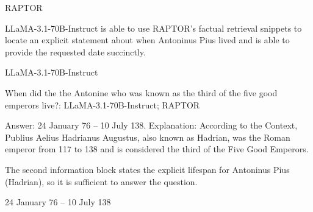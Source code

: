 \begin{tcolorbox}
RAPTOR \par

LLaMA-3.1-70B-Instruct is able to use RAPTOR’s factual retrieval snippets to locate an explicit statement about when Antoninus Pius lived and is able to provide the requested date succinctly. \par

LLaMA-3.1-70B-Instruct \par

{\raggedright
{}When did the the Antonine who was known as the third of the five good emperors live?: LLaMA-3.1-70B-Instruct; RAPTOR\par
}

Answer: 24 January 76 -- 10 July 138. Explanation: According to the Context, Publius Aelius Hadrianus Augustus, also known as Hadrian, was the Roman emperor from 117 to 138 and is considered the third of the Five Good Emperors. \par

The second information block states the explicit lifespan for Antoninus Pius (Hadrian), so it is sufficient to answer the question. \par

24 January 76 -- 10 July 138

\end{tcolorbox}

\captionsetup{justification=centering,singlelinecheck=true}
\label{fig:case-study2}

\clearpage
\twocolumn
